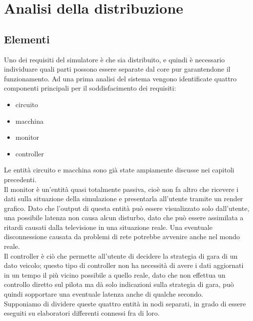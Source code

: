 \chapter{Analisi della distribuzione} %

\label{Chapter5} %



\section{Elementi}

Uno dei requisiti del simulatore è che sia distribuito, e quindi è necessario individuare quali parti possono essere separate dal core pur garantendone il funzionamento.
Ad una prima analisi del sistema vengono identificate quattro componenti principali per il soddisfacimento dei requisiti:
\begin{itemize}
 \item circuito
 \item macchina
 \item monitor
 \item controller
\end{itemize}
Le entità circuito e macchina sono già state ampiamente discusse nei capitoli precedenti. \\
Il monitor è un'entità quasi totalmente passiva, cioè non fa altro che ricevere i dati sulla situazione della simulazione e presentarla all’utente tramite un render grafico. Dato che l’output di questa entità può essere visualizzato solo dall’utente, una possibile latenza non causa alcun disturbo, dato che può essere assimilata a ritardi causati dalla televisione in una situazione reale. Una eventuale disconnessione causata da problemi di rete potrebbe avvenire anche nel mondo reale. \\
Il controller è ciò che permette all’utente di decidere la strategia di gara di un dato veicolo; questo tipo di controller non ha necessità di avere i dati aggiornati in un tempo il più vicino possibile a quello reale, dato che non effettua un controllo diretto sul pilota ma dà solo indicazioni sulla strategia di gara, può quindi sopportare una eventuale latenza anche di qualche secondo. \\
Supponiamo di dividere queste quattro entità in nodi separati, in grado di essere eseguiti su elaboratori differenti connessi fra di loro.
 
